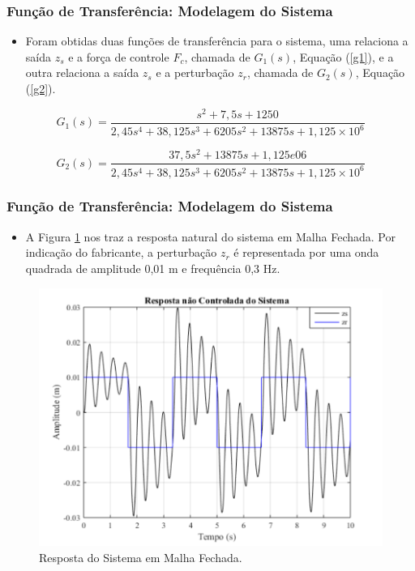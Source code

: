 \documentclass{beamer}
\begin{document}
\begin{frame}
\frametitle{Função de Transferência: Modelagem do Sistema}
\begin{itemize}
\item Foram obtidas duas funções de transferência para o sistema, uma relaciona a saída $z_s$ e a força de controle $F_c$, chamada de $G_1(s)$, Equação (\ref{g1}), e a outra relaciona a saída $z_s$ e a perturbação $z_r$, chamada de $G_2(s)$, Equação (\ref{g2}).
\end{itemize}

\begin{equation}\label{g1}
G_1(s) = \frac{s^2+7,5s+1250}{2,45s^4+38,125s^3+6205s^2+13875s+1,125\times10^6}
\end{equation}

\begin{equation}\label{g2}
G_2(s) = \frac{37,5s^2+13875s+1,125e06}{2,45s^4+38,125s^3+6205s^2+13875s+1,125\times10^6} 
\end{equation}
\end{frame}

\begin{frame}
\frametitle{Função de Transferência: Modelagem do Sistema}
\begin{itemize}
\item A Figura \ref{mfechada} nos traz a resposta natural do sistema em Malha Fechada. Por indicação do fabricante, a perturbação $z_r$ é representada por uma onda quadrada de amplitude 0,01 m e frequência 0,3 Hz.
\end{itemize}

\begin{figure}[H]
  \centering
\includegraphics[width=.5\columnwidth]{./imagens/sistema_malha_fechada.pdf}
    \renewcommand{\figurename}{Fig. 2}
    \caption{Resposta do Sistema em Malha Fechada.}
  \label{mfechada}
\end{figure}
\end{frame}
\end{document}
